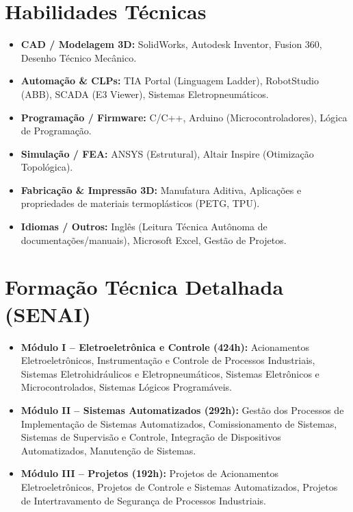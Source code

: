\documentclass[11pt,a4paper,sans]{article}
\begin{document}
\section{Habilidades Técnicas}
\begin{itemize}[nosep, leftmargin=*]
    \item \textbf{CAD / Modelagem 3D:} SolidWorks, Autodesk Inventor, Fusion 360, Desenho Técnico Mecânico.
    \item \textbf{Automação \& CLPs:} TIA Portal (Linguagem Ladder), RobotStudio (ABB), SCADA (E3 Viewer), Sistemas Eletropneumáticos.
    \item \textbf{Programação / Firmware:} C/C++, Arduino (Microcontroladores), Lógica de Programação.
    \item \textbf{Simulação / FEA:} ANSYS (Estrutural), Altair Inspire (Otimização Topológica).
    \item \textbf{Fabricação & Impressão 3D:} Manufatura Aditiva, Aplicações e propriedades de materiais termoplásticos (PETG, TPU).
    \item \textbf{Idiomas / Outros:} Inglês (Leitura Técnica Autônoma de documentações/manuais), Microsoft Excel, Gestão de Projetos.
\end{itemize}

\section{Formação Técnica Detalhada (SENAI)}
\begin{itemize}[nosep, leftmargin=*]
    \item \textbf{Módulo I -- Eletroeletrônica e Controle (424h):} Acionamentos Eletroeletrônicos, Instrumentação e Controle de Processos Industriais, Sistemas Eletrohidráulicos e Eletropneumáticos, Sistemas Eletrônicos e Microcontrolados, Sistemas Lógicos Programáveis.
    \item \textbf{Módulo II -- Sistemas Automatizados (292h):} Gestão dos Processos de Implementação de Sistemas Automatizados, Comissionamento de Sistemas, Sistemas de Supervisão e Controle, Integração de Dispositivos Automatizados, Manutenção de Sistemas.
    \item \textbf{Módulo III -- Projetos (192h):} Projetos de Acionamentos Eletroeletrônicos, Projetos de Controle e Sistemas Automatizados, Projetos de Intertravamento de Segurança de Processos Industriais.
\end{itemize}
\end{document}
